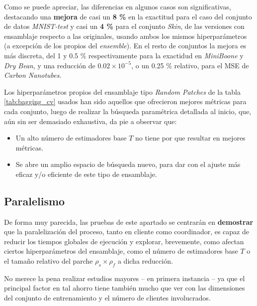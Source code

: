 \documentclass[00-Trabajo_Final.tex]{subfiles}
\begin{document}
Como se puede apreciar, las diferencias en algunos casos son significativas, destacando una \textbf{mejora} de casi un \textbf{8 \%} en la exactitud para el caso del conjunto de datos \textit{MNIST-test} y casi un \textbf{4 \%} para el conjunto \textit{Skin}, de las versiones con ensamblaje respecto a las originales, usando ambos los mismos hiperparámetros (a excepción de los propios del \textit{ensemble}). En el resto de conjuntos la mejora es más discreta, del 1 y 0.5 \% respectivamente para la exactidud en \textit{MiniBoone} y \textit{Dry Bean}, y una reducción de $0.02\times10^{-5}$, o un 0.25 \% relativo, para el MSE de \textit{Carbon Nanotubes}.

\vspace{0.5em}

Los hiperparámetros propios del ensamblaje tipo \textit{Random Patches} de la tabla \ref{tab:bagging_cv} usados han sido aquellos que ofrecieron mejores métricas para cada conjunto, luego de realizar la búsqueda paramétrica detallada al inicio, que, aún sin ser demasiado exhaustiva, da pie a observar que:

\begin{itemize}[noitemsep, topsep=2pt]
    \item Un alto número de estimadores base $T$ no tiene por que resultar en mejores métricas.
    \item Se abre un amplio espacio de búsqueda nuevo, para dar con el ajuste más eficaz y/o eficiente de este tipo de ensamblaje.
\end{itemize}

\subsection{Paralelismo}
De forma muy parecida, las pruebas de este apartado se centrarán en \textbf{demostrar} que la paralelización del proceso, tanto en cliente como coordinador, es capaz de reducir los tiempos globales de ejecución y explorar, brevemente, como afectan ciertos hiperparámetros del ensamblaje, como el número de estimadores base $T$ o el tamaño relativo del parche $\rho_s \times \rho_f$ a dicha reducción.

\vspace{0.5em}

No merece la pena realizar estudios mayores{ }--{ }en primera instancia{ }--{ }ya que el principal factor en tal ahorro tiene también mucho que ver con las dimensiones del conjunto de entrenamiento y el número de clientes involucrados.
\end{document}
